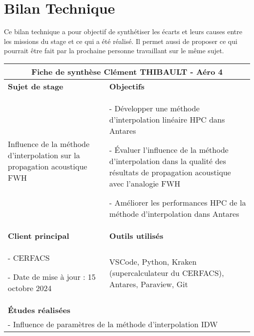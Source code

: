 \section*{Bilan Technique}
Ce bilan technique a pour objectif de synthétiser les écarts et leurs causes entre les missions du stage et ce qui a été réalisé.
Il permet aussi de proposer ce qui pourrait être fait par la prochaine personne travaillant sur le même sujet.


\begin{table}[ht]
\centering
\begin{tabular}{|p{6.5cm}|p{8.5cm}|}
\hline


\multicolumn{2}{|c|}{\textbf{Fiche de synthèse}   \hspace{7cm}   Clément THIBAULT - Aéro 4} \\ 
\hline
\textbf{Sujet de stage} & \textbf{Objectifs} \\ 
\hline


\begin{minipage}[t]{6.5cm}
Influence de la méthode d’interpolation sur la propagation acoustique FWH
\end{minipage} & 
\begin{minipage}[t]{8.5cm}
- Développer une méthode d’interpolation linéaire HPC dans Antares

- Évaluer l’influence de la méthode d’interpolation dans la qualité des résultats de propagation acoustique avec l’analogie FWH

- Améliorer les performances HPC de la méthode d’interpolation dans Antares
\end{minipage} \\ 
\hline
\textbf{Client principal} & \textbf{Outils utilisés} \\ 
\hline
\begin{minipage}[t]{6.5cm}
- CERFACS

- Date de mise à jour : 15 octobre 2024
\end{minipage} & 
\begin{minipage}[t]{8.5cm}
VSCode, Python, Kraken (supercalculateur du CERFACS), Antares, Paraview, Git
\end{minipage} \\ 
\hline
\multicolumn{2}{|l|}{\textbf{Études réalisées}} \\ 
\hline
\multicolumn{2}{|p{14cm}|}{
\begin{minipage}[t]{14cm}
- Influence de paramètres de la méthode d'interpolation IDW


\end{minipage}}
\end{tabular}
\end{table}
